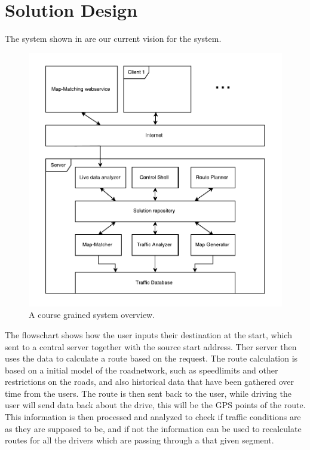 \section{Solution Design}
The system shown in  are our current vision for the system.

\begin{figure}[h!]
  \centering
    \includegraphics[width=1\textwidth]{figures/architecture.pdf}
    \caption{A course grained system overview.}
    \label{fig:systemoverview}
\end{figure}

The flowschart shows how the user inputs their destination at the start, which sent to a central server together with the source start address. Ther server then uses the data to calculate a route based on the request. The route calculation is based on a initial model of the roadnetwork, such as speedlimits and other restrictions on the roads, and also historical data that have been gathered over time from the users. The route is then sent back to the user, while driving the user will send data back about the drive, this will be the GPS points of the route. This information is then processed and analyzed to check if traffic conditions are as they are supposed to be, and if not the information can be used to recalculate routes for all the drivers which are passing through a that given segment.

